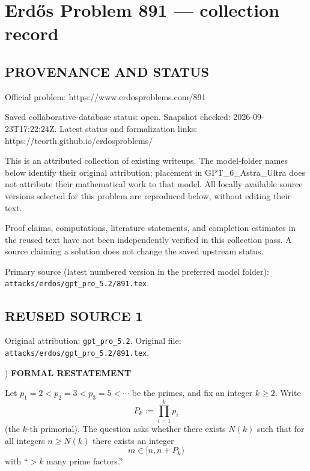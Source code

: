 \section*{Erd\H{o}s Problem 891 --- collection record}

\subsection*{PROVENANCE AND STATUS}
Official problem: https://www.erdosproblems.com/891

Saved collaborative-database status: open.
Snapshot checked: 2026-09-23T17:22:24Z.
Latest status and formalization links: https://teorth.github.io/erdosproblems/

This is an attributed collection of existing writeups. The model-folder names below identify their original attribution; placement in GPT\_6\_Astra\_Ultra does not attribute their mathematical work to that model. All locally available source versions selected for this problem are reproduced below, without editing their text.

Proof claims, computations, literature statements, and completion estimates in the reused text have not been independently verified in this collection pass. A source claiming a solution does not change the saved upstream status.

Primary source (latest numbered version in the preferred model folder): \texttt{attacks/erdos/gpt\_pro\_5.2/891.tex}.

\subsection*{REUSED SOURCE 1}
Original attribution: \texttt{gpt\_pro\_5.2}.
Original file: \texttt{attacks/erdos/gpt\_pro\_5.2/891.tex}.


) \textbf{FORMAL RESTATEMENT}

\noindent Let $p_1=2<p_2=3<p_3=5<\cdots$ be the primes, and fix an integer $k\ge 2$. Write
\[
P_k := \prod_{i=1}^k p_i
\]
(the $k$-th primorial). The question asks whether there exists $N(k)$ such that for all integers $n\ge N(k)$ there exists an integer
\[
 m\in [n,n+P_k)
\]
with ``$>k$ many prime factors.''

